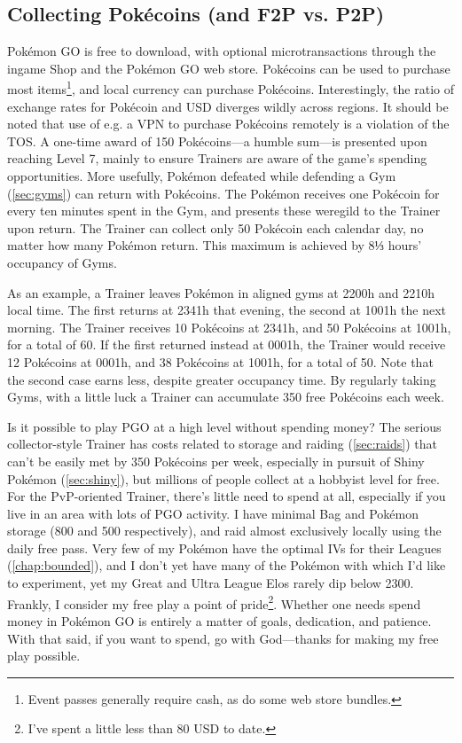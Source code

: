 \subsection{Collecting Pokécoins (and F2P vs. P2P)}
\label{subsec:getcoins}
Pokémon GO is free to download, with optional microtransactions through the ingame
  Shop and the Pokémon GO web store.
Pokécoins can be used to purchase most items\footnote{Event passes generally require cash,
  as do some web store bundles.}, and local currency can purchase Pokécoins.
Interestingly, the ratio of exchange rates for Pokécoin and USD diverges
  wildly across regions.
It should be noted that use of e.g. a VPN to purchase Pokécoins remotely is a
  violation of the TOS.
A one-time award of 150 Pokécoins---a humble sum---is presented upon reaching Level 7,
  mainly to ensure Trainers are aware of the game's spending opportunities.
More usefully, Pokémon defeated while defending a Gym (\autoref{sec:gyms}) can
  return with Pokécoins.
The Pokémon receives one Pokécoin for every ten minutes spent in the Gym,
  and presents these weregild to the Trainer upon return.
The Trainer can collect only 50 Pokécoin each calendar day, no matter how many Pokémon return.
This maximum is achieved by 8⅓ hours' occupancy of Gyms.

As an example, a Trainer leaves Pokémon in aligned gyms at 2200h and 2210h local time.
The first returns at 2341h that evening, the second at 1001h the next morning.
The Trainer receives 10 Pokécoins at 2341h, and 50 Pokécoins at 1001h, for a total of 60.
If the first returned instead at 0001h, the Trainer would receive 12 Pokécoins at 0001h,
  and 38 Pokécoins at 1001h, for a total of 50.
Note that the second case earns less, despite greater occupancy time.
By regularly taking Gyms, with a little luck a Trainer can accumulate 350 free Pokécoins each week.

Is it possible to play PGO at a high level without spending money?
The serious collector-style Trainer has costs related to storage and raiding (\autoref{sec:raids})
  that can't be easily met by 350 Pokécoins per week, especially
  in pursuit of Shiny Pokémon (\autoref{sec:shiny}),
  but millions of people collect at a hobbyist level for free.
For the PvP-oriented Trainer, there's little need to spend at all,
  especially if you live in an area with lots of PGO activity.
I have minimal Bag and Pokémon storage (800 and 500 respectively), and raid almost exclusively locally using the daily free pass.
Very few of my Pokémon have the optimal IVs for their Leagues (\autoref{chap:bounded}),
  and I don't yet have many of the Pokémon with which I'd like to experiment,
  yet my Great and Ultra League Elos rarely dip below 2300.
Frankly, I consider my free play a point of pride\footnote{I've spent a little less than 80 USD to date.}.
Whether one needs spend money in Pokémon GO is entirely a matter of goals, dedication, and patience.
With that said, if you want to spend, go with God---thanks for making my free play possible.

